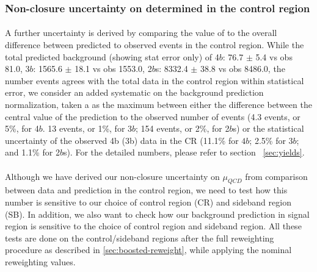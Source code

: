 
\subsubsection{Non-closure uncertainty on \muqcd determined in the control region}
\label{sec:non-closure-mu-qcd}

\paragraph{}
A further uncertainty is derived by comparing the value of \muqcd to the overall difference between predicted to observed events in the control region. While the total predicted background (showing stat error only) of 4$b$: 76.7 $\pm$ 5.4 vs obs 81.0, 3$b$: 1565.6 $\pm$ 18.1 vs obs 1553.0, 2$b$s: 8332.4 $\pm$ 38.8 vs obs 8486.0, the number events agrees with the total data in the control region within statistical error, we consider an added systematic on the background prediction normalization, taken a as the maximum between either the difference between the central value of the prediction to the observed number of events (4.3 events, or 5\%, for 4$b$.  13 events, or 1\%, for 3$b$; 154 events, or 2\%, for 2$b$s) or the statistical uncertainty of the observed 4b (3b) data in the CR (11.1\% for $4b$; 2.5\% for $3b$; and 1.1\% for 2$b$s). For the detailed numbers, please refer to section ~\ref{sec:yields}. 

\paragraph{}
Although we have derived our non-closure uncertainty on $\mu_{QCD}$ from comparison between data and prediction in the control region, we need to test how this number is sensitive to our choice of control region (CR) and sideband region (SB). In addition, we also want to check how our background prediction in signal region is sensitive to the choice of control region and sideband region. All these tests are done on the control/sideband regions after the full reweighting procedure as described in \ref{sec:boosted-reweight}, while applying the nominal reweighting values.

